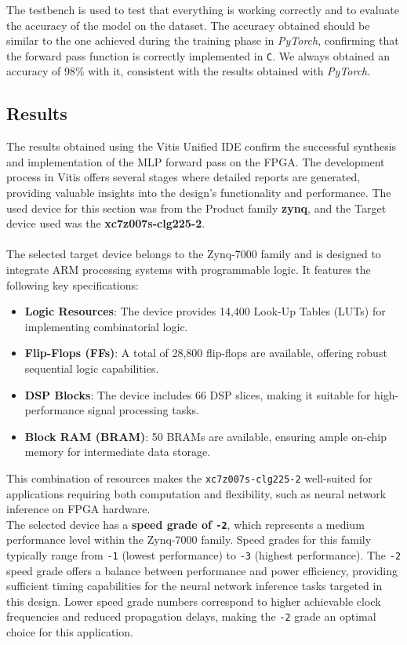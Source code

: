 \documentclass{article}
\begin{document}
The testbench is used to test that everything is working correctly and to evaluate the accuracy of the model on the dataset. The accuracy obtained should be similar to the one achieved during the training phase in \textit{PyTorch}, confirming that the forward pass function is correctly implemented in \texttt{C}.
We always obtained an accuracy of 98\% with it, consistent with the results obtained with \textit{PyTorch}.

\subsection{Results}
The results obtained using the Vitis Unified IDE confirm the successful synthesis and implementation of the MLP forward pass on the FPGA. The development process in Vitis offers several stages where detailed reports are generated, providing valuable insights into the design's functionality and performance. The used device for this section was from the Product family \textbf{zynq}, and the Target device used was the \textbf{xc7z007s-clg225-2}.\\\\
The selected target device belongs to the Zynq-7000 family and is designed to integrate ARM processing systems with programmable logic. It features the following key specifications:
\begin{itemize}
    \item \textbf{Logic Resources}: The device provides 14,400 Look-Up Tables (LUTs) for implementing combinatorial logic.
    \item \textbf{Flip-Flops (FFs)}: A total of 28,800 flip-flops are available, offering robust sequential logic capabilities.
    \item \textbf{DSP Blocks}: The device includes 66 DSP slices, making it suitable for high-performance signal processing tasks.
    \item \textbf{Block RAM (BRAM)}: 50 BRAMs are available, ensuring ample on-chip memory for intermediate data storage.
\end{itemize}
This combination of resources makes the \texttt{xc7z007s-clg225-2} well-suited for applications requiring both computation and flexibility, such as neural network inference on FPGA hardware.\\

The selected device has a \textbf{speed grade of \texttt{-2}}, which represents a medium performance level within the Zynq-7000 family. Speed grades for this family typically range from \texttt{-1} (lowest performance) to \texttt{-3} (highest performance). The \texttt{-2} speed grade offers a balance between performance and power efficiency, providing sufficient timing capabilities for the neural network inference tasks targeted in this design. Lower speed grade numbers correspond to higher achievable clock frequencies and reduced propagation delays, making the \texttt{-2} grade an optimal choice for this application.
\end{document}
